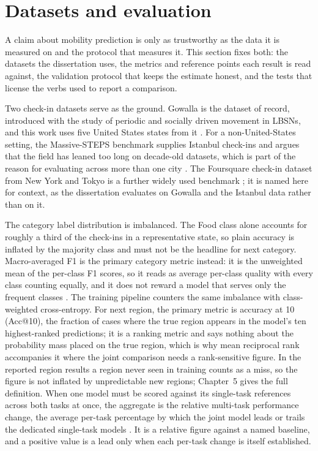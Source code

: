 
\section{Datasets and evaluation}
\label{sec:fund:eval}

A claim about mobility prediction is only as trustworthy as the data it is measured on
and the protocol that measures it. This section fixes both: the datasets the
dissertation uses, the metrics and reference points each result is read against, the
validation protocol that keeps the estimate honest, and the tests that license the
verbs used to report a comparison.

Two check-in datasets serve as the ground. Gowalla is the dataset of record,
introduced with the study of periodic and socially driven movement in LBSNs, and this
work uses five United States states from it \cite{cho2011gowalla}. For a
non-United-States setting, the Massive-STEPS benchmark supplies Istanbul check-ins and
argues that the field has leaned too long on decade-old datasets, which is part of the
reason for evaluating across more than one city \cite{wongso2025massivesteps}. The
Foursquare check-in dataset from New York and Tokyo is a further widely used benchmark
\cite{yang2015tsmc}; it is named here for context, as the dissertation evaluates on
Gowalla and the Istanbul data rather than on it.

The category label distribution is imbalanced. The Food class alone accounts for
roughly a third of the check-ins in a representative state, so plain accuracy is
inflated by the majority class and must not be the headline for next category.
Macro-averaged F1 is the primary category metric instead: it is the unweighted mean of
the per-class F1 scores, so it reads as average per-class quality with every class
counting equally, and it does not reward a model that serves only the frequent classes
\cite{sokolova2009measures}. The training pipeline counters the same imbalance with
class-weighted cross-entropy. For next region, the primary metric is accuracy at 10
(Acc@10), the fraction of cases where the true region appears in the model's ten
highest-ranked predictions; it is a ranking metric and says nothing about the
probability mass placed on the true region, which is why mean reciprocal rank
accompanies it where the joint comparison needs a rank-sensitive figure. In the
reported region results a region never seen in training counts as a miss, so the
figure is not inflated by unpredictable new regions; Chapter~5 gives the full
definition. When one model must be scored against its single-task
references across both tasks at once, the aggregate is the relative multi-task
performance change, the average per-task percentage by which the joint model leads or
trails the dedicated single-task models \cite{maninis2019attentive}. It is a relative
figure against a named baseline, and a positive value is a lead only when each
per-task change is itself established.

